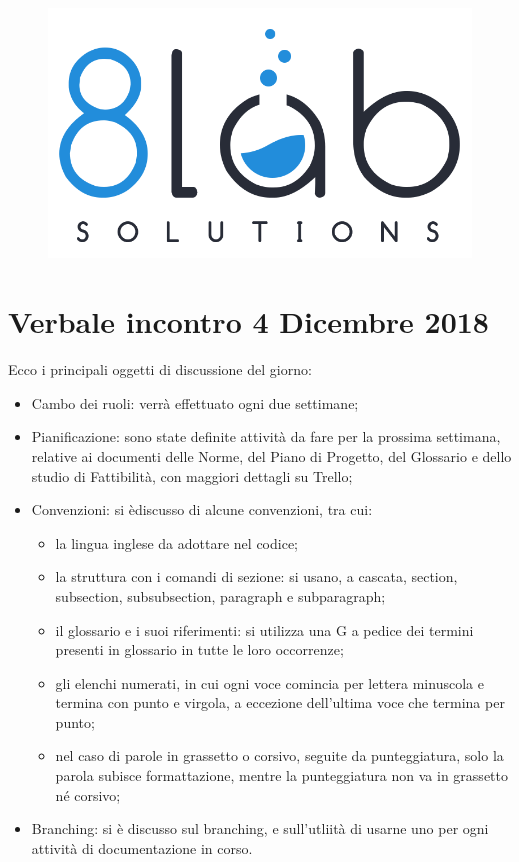 \documentclass[a4paper]{article}
\begin{document}
\begin{figure}
\centering
\includegraphics[scale=0.07]{../res/images/logo8_crop.png}
\end{figure}

\section*{Verbale incontro 4 Dicembre 2018}
Ecco i principali oggetti di discussione del giorno:
\begin{itemize}
	\item Cambo dei ruoli: verrà effettuato ogni due settimane;
	
	\item Pianificazione: sono state definite attività da fare per la prossima settimana, relative ai documenti delle Norme, del Piano di Progetto, del Glossario e dello studio di Fattibilità, con maggiori dettagli su Trello;

	\item Convenzioni: si èdiscusso di alcune convenzioni, tra cui:
	\begin{itemize}
		\item la lingua inglese da adottare nel codice;
		\item la struttura con i comandi di sezione: si usano, a cascata, section, subsection, subsubsection, paragraph e subparagraph;
		\item il glossario e i suoi riferimenti: si utilizza una G a pedice dei termini presenti in glossario in tutte le loro occorrenze;
		\item gli elenchi numerati, in cui ogni voce comincia per lettera minuscola e termina con punto e virgola, a eccezione dell'ultima voce che termina per punto;
		\item nel caso di parole in grassetto o corsivo, seguite da punteggiatura, solo la parola subisce formattazione, mentre la punteggiatura non va in grassetto né corsivo;
	\end{itemize}
	\item Branching: si è discusso sul branching, e sull'utliità di usarne uno per ogni attività  di documentazione in corso.
\end{itemize}
\end{document}
